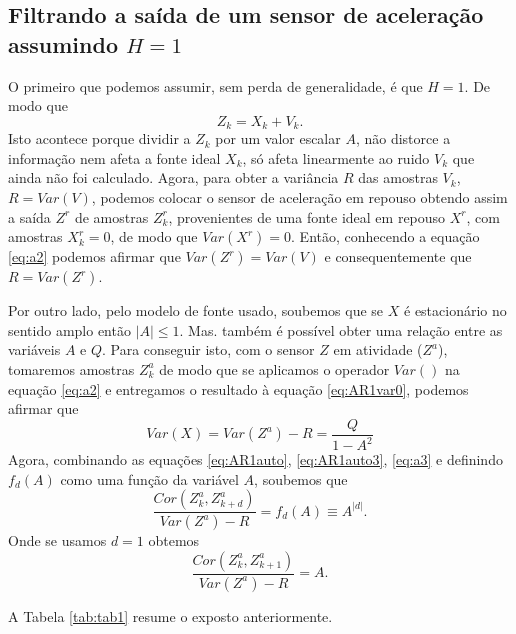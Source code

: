 \documentclass[a4paper,10pt]{article}
\begin{document}
\subsection{Filtrando a saída de um sensor de aceleração assumindo $H=1$} \label{sec:sensor}
O primeiro que podemos assumir, sem perda de generalidade, é que $H=1$. De modo que 
\begin{equation} \label{eq:a2}
 Z_k=X_k +V_k.
\end{equation}
Isto acontece porque dividir a $Z_k$ por um valor escalar $A$, não distorce a informação
nem afeta a fonte ideal $X_k$, só afeta linearmente ao ruido $V_k$ que ainda não foi calculado.
Agora, para obter  a variância $R$ das amostras $V_k$, $R=Var(V)$, 
podemos colocar o sensor de aceleração em repouso 
obtendo assim a saída $Z^r$ de amostras $Z^r_k$, provenientes
de uma fonte ideal em repouso $X^r$, com amostras $X^r_k=0$, de modo que $Var(X^r)=0$. 
Então, conhecendo a equação \eqref{eq:a2} 
podemos afirmar que $Var(Z^r)=Var(V)$ e consequentemente que $R=Var(Z^r)$.

Por outro lado, pelo modelo de fonte usado, soubemos que se $X$ é estacionário no sentido amplo então $|A| \leq 1$.
Mas. também é possível obter uma relação entre as variáveis $A$ e $Q$.  Para conseguir isto, com o sensor $Z$ em atividade ($Z^a$), tomaremos amostras
$Z^a_k$ de modo que se aplicamos o operador $Var()$ na equação \eqref{eq:a2} e entregamos o resultado à
equação \eqref{eq:AR1var0}, podemos afirmar que 
\begin{equation} \label{eq:a3}
 Var(X)=Var(Z^a) -  R = \frac{Q}{1-A^2}
\end{equation}
Agora, combinando as equações \eqref{eq:AR1auto}, \eqref{eq:AR1auto3}, \eqref{eq:a3}
e definindo $f_d(A)$ como uma função da variável $A$, soubemos que
\begin{equation} \label{eq:a4}
\frac{Cor(Z^a_k,Z^a_{k+d})}{Var(Z^a) -  R} = f_d(A) \equiv A^{|d|}.
\end{equation} 
Onde se usamos $d=1$ obtemos
\begin{equation} \label{eq:a5}
\frac{Cor(Z^a_k,Z^a_{k+1})}{Var(Z^a) -  R} = A.
\end{equation} 

A Tabela \ref{tab:tab1} resume o exposto anteriormente.
\end{document}
